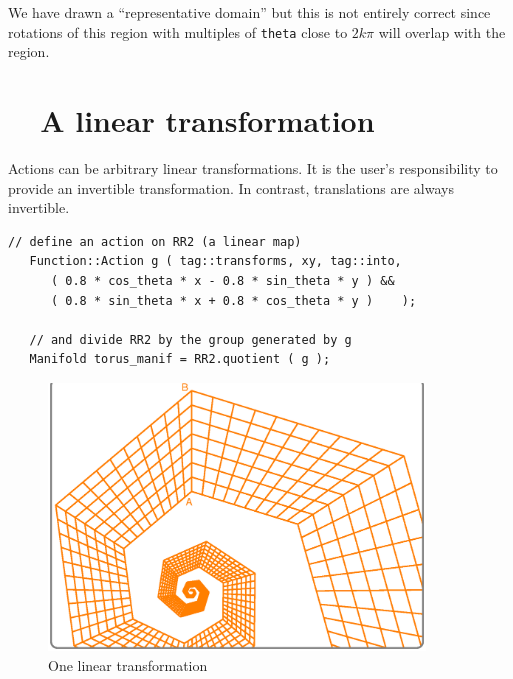 We have drawn a ``representative domain'' but this is not entirely correct since
rotations of this region with multiples of {\small\tt theta} close to $ 2k\pi $
will overlap with the region.


\section{~~A linear transformation}\label{\numb section 7.\numb parag 12}

Actions can be arbitrary linear transformations.
It is the user's responsibility to provide an invertible transformation.
In contrast, translations are always invertible.

\begin{Verbatim}[commandchars=\\\{\},formatcom=\small\tt,frame=single,
   label=parag-\ref{\numb section 7.\numb parag 12}.cpp,rulecolor=\color{coment},
   baselinestretch=0.94,framesep=2mm                                             ]
   // define an action on RR2 (a linear map)
   Function::Action g ( tag::transforms, xy, tag::into,
      ( 0.8 * cos_theta * x - 0.8 * sin_theta * y ) &&
      ( 0.8 * sin_theta * x + 0.8 * cos_theta * y )    );

   // and divide RR2 by the group generated by g
   Manifold torus_manif = RR2.quotient ( g );
\end{Verbatim}

\begin{figure}[ht] \centering
  \includegraphics[width=100mm]{sector-2.eps}
  \caption{One linear transformation}
  \label{\numb section 7.\numb fig 8}
\end{figure}


